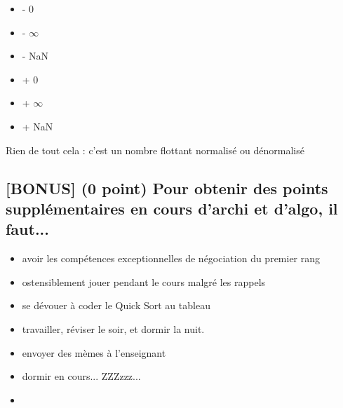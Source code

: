 \documentclass[11pt,a4paper]{article}
\begin{document}
\begin{table}[h!]
  \centering
  \begin{minipage}{0.45\textwidth}
\begin{itemize}
  \item[\CaseCoche] - 0            \phantom{(} \\
  \item[\CaseCoche] - $ \infty $   \phantom{(} \\  
  \item[\CaseCoche] - NaN          \phantom{(} \\
\end{itemize}
  \end{minipage}
  \hfillx
  \begin{minipage}{0.45\textwidth}
    \centering
\begin{itemize}
  \item[\CaseCoche] + 0           \phantom{(} \\
  \item[\CaseCoche] + $ \infty $  \phantom{(} \\
  \item[\CaseCoche] + NaN         \phantom{(} \\
\end{itemize}
  \end{minipage}
\end{table}

\begin{center}
\checkmark

{ \large Rien de tout cela : c'est un nombre flottant normalisé ou dénormalisé }
\end{center}

\bigskip


\subsection{[BONUS] (0 point) Pour obtenir des points supplémentaires en cours d'archi et d'algo, il faut... }

\begin{itemize}
  \item[\CaseCoche] avoir les compétences exceptionnelles de négociation du premier rang \\
  \item[\CaseCoche] ostensiblement jouer pendant le cours malgré les rappels \\
  \item[\CaseCoche] se dévouer à coder le Quick Sort au tableau \\
  \item[\checkmark] travailler, réviser le soir, et dormir la nuit. \\
  \item[\CaseCoche] envoyer des mèmes à l'enseignant \\
  \item[\CaseCoche] dormir en cours... ZZZzzz... \\
  \item[\CaseCoche] \phantom{autre :} \\
\end{itemize}
\end{document}
